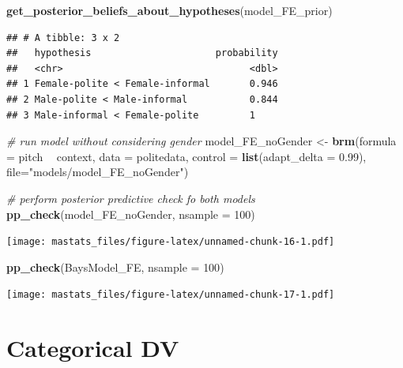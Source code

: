 \documentclass[]{book}
\newenvironment{Shaded}{\begin{snugshade}}{\end{snugshade}}
\newcommand{\CommentTok}[1]{\textcolor[rgb]{0.56,0.35,0.01}{\textit{#1}}}
\newcommand{\DataTypeTok}[1]{\textcolor[rgb]{0.13,0.29,0.53}{#1}}
\newcommand{\DecValTok}[1]{\textcolor[rgb]{0.00,0.00,0.81}{#1}}
\newcommand{\FloatTok}[1]{\textcolor[rgb]{0.00,0.00,0.81}{#1}}
\newcommand{\KeywordTok}[1]{\textcolor[rgb]{0.13,0.29,0.53}{\textbf{#1}}}
\newcommand{\NormalTok}[1]{#1}
\newcommand{\OperatorTok}[1]{\textcolor[rgb]{0.81,0.36,0.00}{\textbf{#1}}}
\newcommand{\StringTok}[1]{\textcolor[rgb]{0.31,0.60,0.02}{#1}}
\begin{document}
\begin{Shaded}
\begin{Highlighting}[]
\KeywordTok{get_posterior_beliefs_about_hypotheses}\NormalTok{(model_FE_prior)}
\end{Highlighting}
\end{Shaded}

\begin{verbatim}
## # A tibble: 3 x 2
##   hypothesis                      probability
##   <chr>                                 <dbl>
## 1 Female-polite < Female-informal       0.946
## 2 Male-polite < Male-informal           0.844
## 3 Male-informal < Female-polite         1
\end{verbatim}

\begin{Shaded}
\begin{Highlighting}[]
\CommentTok{# run model without considering gender}
\NormalTok{model_FE_noGender <-}\StringTok{ }\KeywordTok{brm}\NormalTok{(}\DataTypeTok{formula =}\NormalTok{  pitch }\OperatorTok{~}\StringTok{ }\NormalTok{context,}
                        \DataTypeTok{data =}\NormalTok{ politedata,}
                        \DataTypeTok{control =} \KeywordTok{list}\NormalTok{(}\DataTypeTok{adapt_delta =} \FloatTok{0.99}\NormalTok{),}
                        \DataTypeTok{file=}\StringTok{"models/model_FE_noGender"}\NormalTok{)}
\end{Highlighting}
\end{Shaded}

\begin{Shaded}
\begin{Highlighting}[]
\CommentTok{# perform posterior predictive check fo both models}
\KeywordTok{pp_check}\NormalTok{(model_FE_noGender, }\DataTypeTok{nsample =} \DecValTok{100}\NormalTok{)}
\end{Highlighting}
\end{Shaded}

\texttt{[image: mastats\_files/figure-latex/unnamed-chunk-16-1.pdf]}

\begin{Shaded}
\begin{Highlighting}[]
\KeywordTok{pp_check}\NormalTok{(BaysModel_FE, }\DataTypeTok{nsample =} \DecValTok{100}\NormalTok{) }
\end{Highlighting}
\end{Shaded}

\texttt{[image: mastats\_files/figure-latex/unnamed-chunk-17-1.pdf]}

\hypertarget{categorical-dv}{%
\section{Categorical DV}\label{categorical-dv}}


\end{document}
